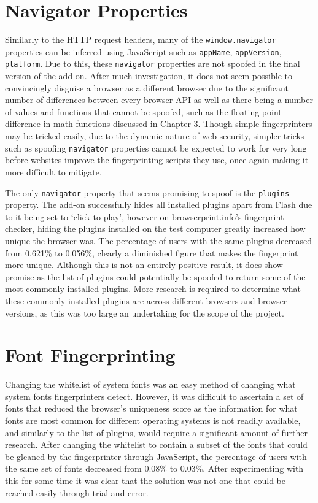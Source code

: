 \section{Navigator Properties}

Similarly to the HTTP request headers, many of the \texttt{window.navigator} properties can be inferred using JavaScript such as \texttt{appName}, \texttt{appVersion}, \texttt{platform}.
Due to this, these \texttt{navigator} properties are not spoofed in the final version of the add-on.
After much investigation, it does not seem possible to convincingly disguise a browser as a different browser due to the significant number of differences between every browser API as well as there being a number of values and functions that cannot be spoofed, such as the floating point difference in math functions discussed in Chapter 3.
Though simple fingerprinters may be tricked easily, due to the dynamic nature of web security, simpler tricks such as spoofing \texttt{navigator} properties cannot be expected to work for very long before websites improve the fingerprinting scripts they use, once again making it more difficult to mitigate.

The only \texttt{navigator} property that seems promising to spoof is the \texttt{plugins} property.
The add-on successfully hides all installed plugins apart from Flash due to it being set to `click-to-play', however on \url{browserprint.info}'s fingerprint checker, hiding the plugins installed on the test computer greatly increased how unique the browser was.
The percentage of users with the same plugins decreased from 0.621\% to 0.056\%, clearly a diminished figure that makes the fingerprint more unique.
Although this is not an entirely positive result, it does show promise as the list of plugins could potentially be spoofed to return some of the most commonly installed plugins.
More research is required to determine what these commonly installed plugins are across different browsers and browser versions, as this was too large an undertaking for the scope of the project.

\section{Font Fingerprinting}

Changing the whitelist of system fonts was an easy method of changing what system fonts fingerprinters detect.
However, it was difficult to ascertain a set of fonts that reduced the browser's uniqueness score as the information for what fonts are most common for different operating systems is not readily available, and similarly to the list of plugins, would require a significant amount of further research.
After changing the whitelist to contain a subset of the fonts that could be gleaned by the fingerprinter through JavaScript, the percentage of users with the same set of fonts decreased from 0.08\% to 0.03\%.
After experimenting with this for some time it was clear that the solution was not one that could be reached easily through trial and error.

